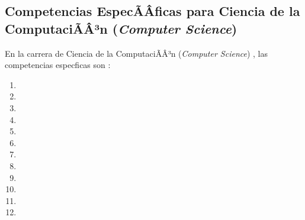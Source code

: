 \subsection{Competencias EspecÃÂ­ficas para Ciencia de la ComputaciÃÂ³n (\textit{Computer Science})}
En la carrera de Ciencia de la ComputaciÃÂ³n (\textit{Computer Science}) \cite{CS2013}, las competencias espec ficas son \cite{IEEECompetences}:

\begin{enumerate}
\renewcommand{\theenumi}{CS\arabic{enumi}}
\item {}
\item {}
\item {}
\item {}
\item {}
\item {}
\item {}
\item {}
\item {}
\item {}
\item {}
\item {}
\end{enumerate}
